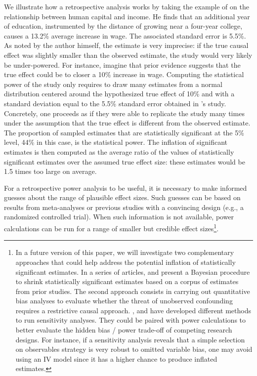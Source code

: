 \documentclass[12pt]{article}
\begin{document}
    We illustrate how a retrospective analysis works by taking the example of \cite{card_using_1993} on the relationship between human capital and income. He finds that an additional year of education, instrumented by the distance of growing near a four-year college, causes a 13.2\% average increase in wage. The associated standard error is 5.5\%. As noted by the author himself, the estimate is very imprecise: if the true causal effect was slightly smaller than the observed estimate, the study would very likely be under-powered. For instance, imagine that prior evidence suggests that the true effect could be to closer a 10\% increase in wage. Computing the statistical power of the study only requires to draw many estimates from a normal distribution centered around the hypothesized true effect of 10\% and with a standard deviation equal to the 5.5\% standard error obtained in \citeauthor{card_using_1993}'s study. Concretely, one proceeds as if they were able to replicate the study many times under the assumption that the true effect is different from the observed estimate. The proportion of sampled estimates that are statistically significant at the 5\% level, 44\% in this case, is the statistical power. The inflation of significant estimates is then computed as the average ratio of the values of statistically significant estimates over the assumed true effect size: these estimates would be 1.5 times too large on average. 
    
    For a retrospective power analysis to be useful, it is necessary to make informed guesses about the range of plausible effect sizes. Such guesses can be based on results from meta-analyses or previous studies with a convincing design (e.g., a randomized controlled trial). When such information is not available, power calculations can be run for a range of smaller but credible effect sizes\footnote{In a future version of this paper, we will investigate two complementary approaches that could help address the potential inflation of statistically significant estimates. 
    In a series of articles, \cite{zwet_proposal_2021, zwet_significance_2021} and \cite{zwet_statistical_2021} present a Bayesian procedure to shrink statistically significant estimates based on a corpus of estimates from prior studies.
    The second approach consists in carrying out quantitative bias analyses to evaluate whether the threat of unobserved confounding requires a restrictive causal approach. \cite{rosenbaum_observational_2002}, \cite{oster_unobservable_2019} and \cite{cinelli_making_2020} have developed different methods to run sensitivity analyses. They could be paired with power calculations to better evaluate the hidden bias / power trade-off of competing research designs. For instance, if a sensitivity analysis reveals that a simple selection on observables strategy is very robust to omitted variable bias, one may avoid using an IV model since it has a higher chance to produce inflated estimates.}.
    
\end{document}

